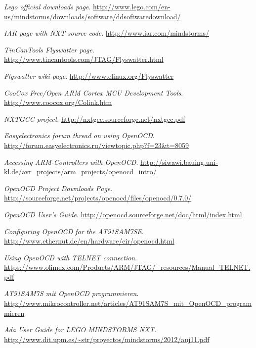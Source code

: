 \documentclass[11pt]{article}
\begin{document}
	\clearpage
	\begin{thebibliography}{9}

			\emph{Lego official downloads page}.
			\url{http://www.lego.com/en-us/mindstorms/downloads/software/ddsoftwaredownload/}

			\emph{IAR page with NXT source code}.
			\url{http://www.iar.com/mindstorms/}

			\emph{TinCanTools Flyswatter page}.
			\url{http://www.tincantools.com/JTAG/Flyswatter.html}

			\emph{Flyswatter wiki page}.
			\url{http://www.elinux.org/Flyswatter}

			\emph{CooCox Free/Open ARM Cortex MCU Development Tools}.
			\url{http://www.coocox.org/Colink.htm}

			\emph{NXTGCC project}.
			\url{http://nxtgcc.sourceforge.net/nxtgcc.pdf}

			\emph{Easyelectronics forum thread on using OpenOCD}.
			\url{http://forum.easyelectronics.ru/viewtopic.php?f=23&t=8059}

			\emph{Accessing ARM-Controllers with OpenOCD}.
			\url{http://siwawi.bauing.uni-kl.de/avr_projects/arm_projects/openocd_intro/}

			\emph{OpenOCD Project Downloads Page}.
			\url{http://sourceforge.net/projects/openocd/files/openocd/0.7.0/}

			\emph{OpenOCD User's Guide}.
			\url{http://openocd.sourceforge.net/doc/html/index.html}

			\emph{Configuring OpenOCD for the AT91SAM7SE}.
			\url{http://www.ethernut.de/en/hardware/eir/openocd.html}

			\emph{Using OpenOCD with TELNET connection}.
			\url{https://www.olimex.com/Products/ARM/JTAG/_resources/Manual_TELNET.pdf}

			\emph{AT91SAM7S mit OpenOCD programmieren}.
			\url{http://www.mikrocontroller.net/articles/AT91SAM7S_mit_OpenOCD_programmieren}

			\emph{Ada User Guide for LEGO MINDSTORMS NXT}.
			\url{http://www.dit.upm.es/~str/proyectos/mindstorms/2012/auj11.pdf}


\end{thebibliography}
\end{document}
